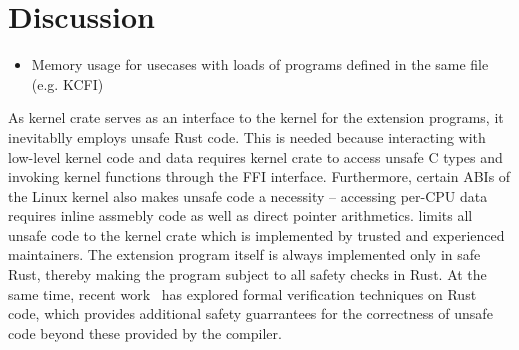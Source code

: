 \section{Discussion}
\begin{itemize}
    \item Memory usage for usecases with loads of programs defined in the same
        file (e.g. KCFI)
\end{itemize}

As \projname{} kernel crate serves as an interface to the kernel for the
    extension programs, it inevitablly employs unsafe Rust code.
This is needed because interacting with low-level kernel code and data requires
    kernel crate to access unsafe C types and invoking kernel functions through
    the FFI interface.
Furthermore, certain ABIs of the Linux kernel also makes unsafe code a
    necessity -- accessing per-CPU data requires inline assmebly code as well
    as direct pointer arithmetics.
\projname{} limits all unsafe code to the kernel crate which is implemented by
    trusted and experienced maintainers.
The extension program itself is always implemented only in safe Rust, thereby
    making the program subject to all safety checks in Rust.
At the same time, recent work~\cite{verus} has explored formal verification
    techniques on Rust code, which provides additional safety guarrantees
    for the correctness of unsafe code beyond these provided by the compiler.

